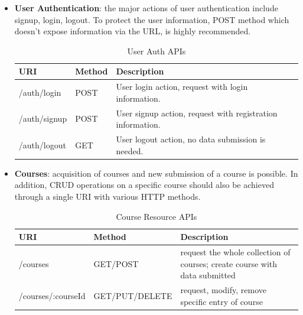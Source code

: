 \begin{itemize}
\item
\textbf{User Authentication}: the major actions of user authentication include signup, login, logout. To protect the user information, POST method which doesn't expose information via the URL, is highly recommended.

\begin{table}[!htbp]
\centering
\begin{tabularx}{\textwidth}{@{}llX@{}}
\toprule
URI          & Method & Description                                                  \\ \midrule
/auth/login  & POST   & User login action, request with login information.           \\
/auth/signup & POST   & User signup action, request with registration information.   \\
/auth/logout & GET    & User logout action, no data submission is needed.            \\ \bottomrule
\end{tabularx}
\caption{User Auth APIs}
\label{table:user-auth-apis}
\end{table}

\item
\textbf{Courses}: acquisition of courses and new submission of a course is possible. In addition, \gls{CRUD} operations on a specific course should also be achieved through a single URI with various HTTP methods.

\begin{table}[!htbp]
\centering

\begin{tabularx}{\textwidth}{@{}llX@{}}
\toprule
URI                 & Method         & Description                                                                                                          \\ \midrule
/courses            & GET/POST       & request the whole collection of courses; create course with data submitted \\
/courses/:courseId & GET/PUT/DELETE & request, modify, remove specific entry of course                                                                     \\ \bottomrule
\end{tabularx}
\caption{Course Resource APIs}
\label{table:course-resource-apis}
\end{table}


\end{itemize}
